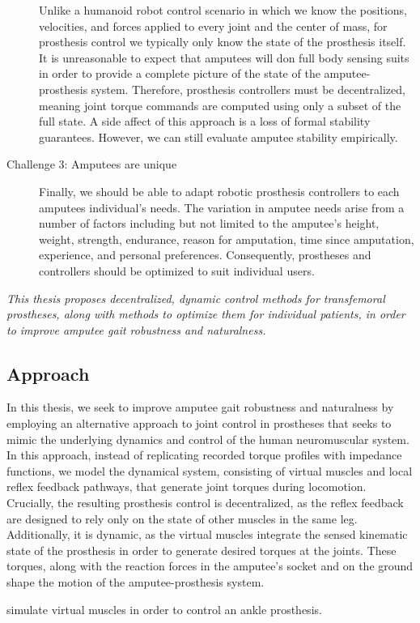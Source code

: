 \begin{description}
    Unlike a humanoid robot control scenario in which we know the positions,
    velocities, and forces applied to every joint and the center of mass, for
    prosthesis control we typically only know the state of the prosthesis
    itself. It is unreasonable to expect that amputees will don full body
    sensing suits in order to provide a complete picture of the state of the
    amputee-prosthesis system. Therefore, prosthesis controllers must be
    decentralized, meaning joint torque commands are computed using only a
    subset of the full state. A side affect of this approach is a loss of formal
    stability guarantees. However, we can still evaluate amputee stability
    empirically.

    \item[Challenge 3: Amputees are unique]
    
    Finally, we should be able to adapt robotic prosthesis controllers to each
    amputees individual's needs. The variation in amputee needs arise from a
    number of factors including but not limited to the amputee's height, weight,
    strength, endurance, reason for amputation, time since amputation, 
    experience, and personal preferences. Consequently, prostheses and
    controllers should be optimized to suit individual users.
\end{description}

\begin{fullwidth}
\emph{This thesis proposes decentralized, dynamic control methods for
transfemoral prostheses, along with methods to optimize them for individual
patients, in order to improve amputee gait robustness and naturalness.}
\end{fullwidth}

\subsection{Approach}

In this thesis, we seek to improve amputee gait robustness and naturalness by
employing an alternative approach to joint control in prostheses that seeks to
mimic the underlying dynamics and control of the human neuromuscular system. In
this approach, instead of replicating recorded torque profiles with impedance
functions, we model the dynamical system, consisting of virtual muscles and
local reflex feedback pathways, that generate joint torques during locomotion.
Crucially, the resulting prosthesis control is decentralized, as the reflex
feedback are designed to rely only on the state of other muscles in the same
leg. Additionally, it is dynamic, as the virtual muscles integrate the sensed
kinematic state of the prosthesis in order to generate desired torques at the
joints. These torques, along with the reaction forces in the amputee's socket
and on the ground shape the motion of the amputee-prosthesis system.
\begin{marginfigure}
    \centering
    \caption{\citet{eilenberg2010control} simulate virtual muscles in
    order to control an ankle prosthesis.}
    \label{fig:eilenberg_muscle}
\end{marginfigure}

